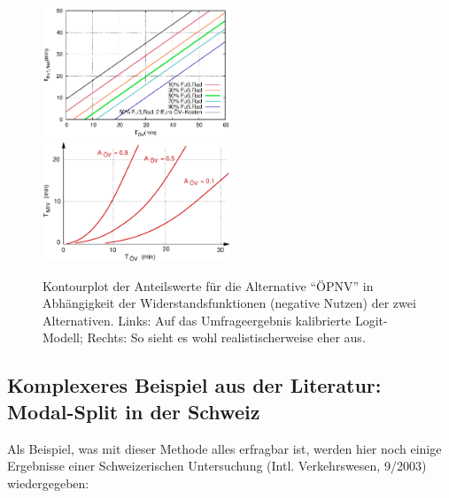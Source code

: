 \begin{figure}
\includegraphics[width=0.50\textwidth]{figsErh/VkoekSS09_statedChoice_5.eps}
\includegraphics[width=0.50\textwidth]{figsErh/StatedChoice.eps}
\caption{\label{fig:statedChoiceContour} Kontourplot der Anteilswerte f\"ur
die Alternative ``\"OPNV'' in Abh\"angigkeit der Widerstandsfunktionen
(negative Nutzen) der zwei Alternativen. Links: Auf das
Umfrageergebnis kalibrierte Logit-Modell; Rechts: So sieht es wohl
realistischerweise eher aus.
}
\end{figure}

\subsection{Komplexeres Beispiel aus der Literatur: Modal-Split in der Schweiz}
Als Beispiel, was mit dieser Methode alles erfragbar ist, werden hier
noch einige Ergebnisse einer Schweizerischen Untersuchung
(Intl. Verkehrswesen, 9/2003) wiedergegeben:

